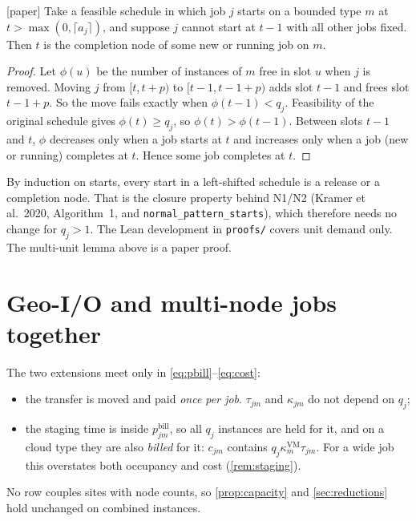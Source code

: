 \documentclass[11pt,a4paper]{article}
\newcommand{\code}[1]{\texttt{#1}}
\newcommand{\bill}{\mathrm{bill}}
\newcommand{\status}[1]{\textsf{\small[#1]}}
\begin{document}
\begin{lemma}\label{lem:leftshift}
\status{paper} Take a feasible schedule in which job $j$ starts on a bounded
type $m$ at $t>\max(0,\lceil a_j\rceil)$, and suppose $j$ cannot start at
$t-1$ with all other jobs fixed. Then $t$ is the completion node of some new
or running job on $m$.
\end{lemma}

\begin{proof}
Let $\phi(u)$ be the number of instances of $m$ free in slot $u$ when $j$ is
removed. Moving $j$ from $[t,t+p)$ to $[t-1,t-1+p)$ adds slot $t-1$ and frees
slot $t-1+p$. So the move fails exactly when $\phi(t-1)<q_j$. Feasibility of
the original schedule gives $\phi(t)\ge q_j$, so $\phi(t)>\phi(t-1)$. Between
slots $t-1$ and $t$, $\phi$ decreases only when a job starts at $t$ and
increases only when a job (new or running) completes at $t$. Hence some job
completes at $t$.
\end{proof}

\noindent By induction on starts, every start in a left-shifted schedule is a
release or a completion node. That is the closure property behind N1/N2
(Kramer et al.\ 2020, Algorithm~1, and \code{normal\_pattern\_starts}), which
therefore needs no change for $q_j>1$. The Lean development in
\code{proofs/} covers unit demand only. The multi-unit lemma above is a
paper proof.

\section{Geo-I/O and multi-node jobs together}\label{sec:combined}

The two extensions meet only in \eqref{eq:pbill}--\eqref{eq:cost}:
\begin{itemize}[leftmargin=*]
\item the transfer is moved and paid \emph{once per job}. $\tau_{jm}$ and
  $\kappa_{jm}$ do not depend on $q_j$;
\item the staging time is inside $p^\bill_{jm}$, so all $q_j$ instances are
  held for it, and on a cloud type they are also \emph{billed} for it:
  $c_{jm}$ contains $q_j\kappa^{\mathrm{VM}}_m\tau_{jm}$. For a wide job this
  overstates both occupancy and cost (\cref{rem:staging}).
\end{itemize}
No row couples sites with node counts, so \cref{prop:capacity} and
\cref{sec:reductions} hold unchanged on combined instances.
\end{document}
